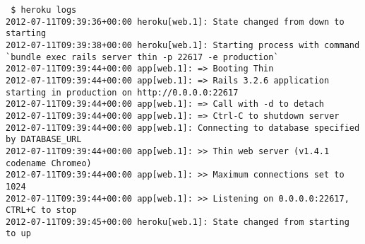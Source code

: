 \begin{verbatim}
 $ heroku logs
2012-07-11T09:39:36+00:00 heroku[web.1]: State changed from down to starting
2012-07-11T09:39:38+00:00 heroku[web.1]: Starting process with command `bundle exec rails server thin -p 22617 -e production`
2012-07-11T09:39:44+00:00 app[web.1]: => Booting Thin
2012-07-11T09:39:44+00:00 app[web.1]: => Rails 3.2.6 application starting in production on http://0.0.0.0:22617
2012-07-11T09:39:44+00:00 app[web.1]: => Call with -d to detach
2012-07-11T09:39:44+00:00 app[web.1]: => Ctrl-C to shutdown server
2012-07-11T09:39:44+00:00 app[web.1]: Connecting to database specified by DATABASE_URL
2012-07-11T09:39:44+00:00 app[web.1]: >> Thin web server (v1.4.1 codename Chromeo)
2012-07-11T09:39:44+00:00 app[web.1]: >> Maximum connections set to 1024
2012-07-11T09:39:44+00:00 app[web.1]: >> Listening on 0.0.0.0:22617, CTRL+C to stop
2012-07-11T09:39:45+00:00 heroku[web.1]: State changed from starting to up

\end{verbatim}



